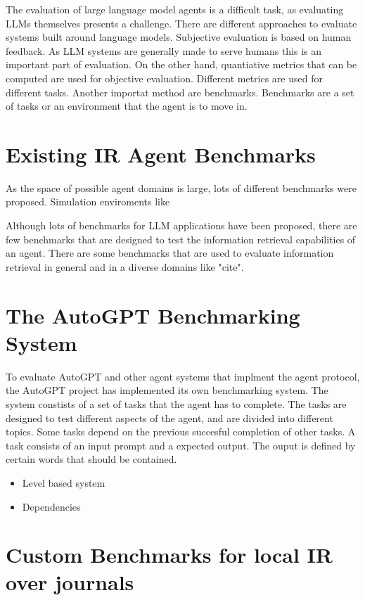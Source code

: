 \documentclass[english, version-2022-01]{uzl-thesis}
\begin{document}
The evaluation of large language model agents is a difficult task, as evaluating LLMs themselves presents a challenge. There are different approaches to evaluate systems built around language models. Subjective evaluation is based on human feedback. As LLM systems are generally made to serve humans this is an important part of evaluation. On the other hand, quantiative metrics that can be computed are used for objective evaluation. Different metrics are used for different tasks. Another importat method are benchmarks. Benchmarks are a set of tasks or an environment that the agent is to move in.

\section{Existing IR Agent Benchmarks}

As the space of possible agent domains is large, lots of different benchmarks were proposed. Simulation enviroments like

Although lots of benchmarks for LLM applications have been proposed, there are few benchmarks that are designed to test the information retrieval capabilities of an agent. There are some benchmarks that are used to evaluate information retrieval in general and in a diverse domains like "cite".

\section{The AutoGPT Benchmarking System}

To evaluate AutoGPT and other agent systems that implment the agent protocol, the AutoGPT project has implemented its own benchmarking system. The system constists of a set of tasks that the agent has to complete. The tasks are designed to test different aspects of the agent, and are divided into different topics. Some tasks depend on the previous succesful completion of other tasks. A task consists of an input prompt and a expected output. The ouput is defined by certain words that should be contained.

\begin{itemize}
	\item Level based system
	\item Dependencies
\end{itemize}

\section{Custom Benchmarks for local IR over journals}
\end{document}

